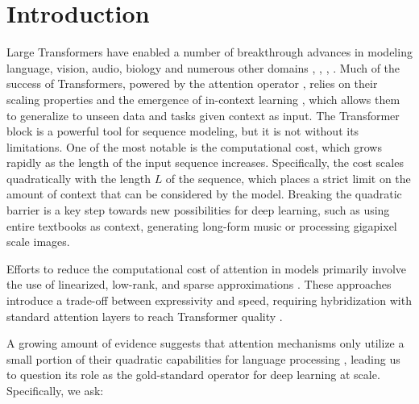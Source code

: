 \section{Introduction}
%
Large Transformers have enabled a number of breakthrough advances in modeling language, vision, audio, biology and numerous other domains \citep{vaswani2017attention}, \citep{dosovitskiy2020image}, \citep{radford2022robust}, \citep{cramer2021alphafold2}. Much of the success of Transformers, powered by the attention operator \citep{vaswani2017attention}, relies on their scaling properties \citep{hoffmann2022training} and the emergence of in-context learning \citep{garg2022can}, which allows them to generalize to unseen data and tasks given context as input. 
%
The Transformer block is a powerful tool for sequence modeling, but it is not without its limitations. One of the most notable is the computational cost, which grows rapidly as the length of the input sequence increases. Specifically, the cost scales quadratically with the length $L$ of the sequence, which places a strict limit on the amount of context that can be considered by the model.
%
Breaking the quadratic barrier is a key step towards new possibilities for deep learning, such as using entire textbooks as context, generating long-form music or processing gigapixel scale images.

Efforts to reduce the computational cost of attention in models primarily involve the use of linearized, low-rank, and sparse approximations \citep{child2019generating,wang2020linformer,kitaev2020reformer,zhai2021attention,roy2021efficient,schlag2021linear,tu2022maxvit}. These approaches introduce a trade-off between expressivity and speed, requiring hybridization with standard attention layers to reach Transformer quality \citep{mehta2022long,dao2022hungry}.

A growing amount of evidence suggests that attention mechanisms only utilize a small portion of their quadratic capabilities for language processing \citep{olsson2022context, dao2022hungry}, leading us to question its role as the gold-standard operator for deep learning at scale. Specifically, we ask:


